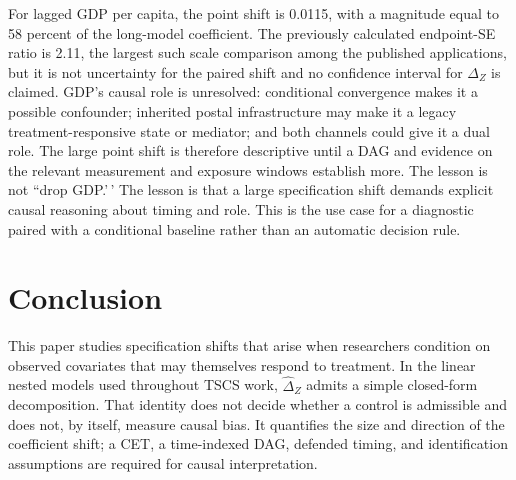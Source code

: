 \documentclass[
]{article}
\begin{document}
\begin{table}[!h]
\centering
\caption{\label{tab:rogowski-ivb-table}Specification-shift decomposition for Rogowski et al. (2022).}
\centering
{}
\end{table}

For lagged GDP per capita, the point shift is 0.0115, with a magnitude
equal to 58 percent of the long-model coefficient. The previously
calculated endpoint-SE ratio is 2.11, the largest such scale comparison
among the published applications, but it is not uncertainty for the
paired shift and no confidence interval for \(\Delta_Z\) is claimed.
GDP's causal role is unresolved: conditional convergence makes it a
possible confounder; inherited postal infrastructure may make it a
legacy treatment-responsive state or mediator; and both channels could
give it a dual role. The large point shift is therefore descriptive
until a DAG and evidence on the relevant measurement and exposure
windows establish more. The lesson is not ``drop GDP.'\,' The lesson is
that a large specification shift demands explicit causal reasoning about
timing and role. This is the use case for a diagnostic paired with a
conditional baseline rather than an automatic decision rule.

\section{\texorpdfstring{Conclusion
\label{sec:conclusion}}{Conclusion }}\label{conclusion}

This paper studies specification shifts that arise when researchers
condition on observed covariates that may themselves respond to
treatment. In the linear nested models used throughout TSCS work,
\(\widehat{\Delta}_Z\) admits a simple closed-form decomposition. That
identity does not decide whether a control is admissible and does not,
by itself, measure causal bias. It quantifies the size and direction of
the coefficient shift; a CET, a time-indexed DAG, defended timing, and
identification assumptions are required for causal interpretation.
\end{document}
